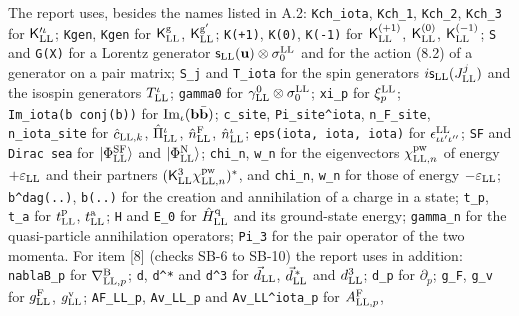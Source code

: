 \documentclass[
  10pt,
]{article}
\begin{document}
The report uses, besides the names listed in A.2:
\texttt{Kch\textquotesingle{}\_iota}, \texttt{Kch\textquotesingle{}\_1},
\texttt{Kch\textquotesingle{}\_2}, \texttt{Kch\textquotesingle{}\_3} for
\(\mathsf K'^\iota_{\rm LL}\); \texttt{Kgen},
\texttt{Kgen\textquotesingle{}} for \(\mathsf K^{\rm g}_{\rm LL}\),
\(\mathsf K^{\rm g'}_{\rm LL}\); \texttt{K(+1)}, \texttt{K(0)},
\texttt{K(-1)} for \(\mathsf K^{(+1)}_{\rm LL}\),
\(\mathsf K^{(0)}_{\rm LL}\), \(\mathsf K^{(-1)}_{\rm LL}\); \texttt{S}
and \texttt{G(X)} for a Lorentz generator
\(\mathsf s_{\rm LL}(\mathbf u)\otimes\sigma^{\rm LL}_0\) and for the
action (8.2) of a generator on a pair matrix; \texttt{S\_j} and
\texttt{T\_iota} for the spin generators
\(i\mathsf s_{\rm LL}(J^j_{\rm LL})\) and the isospin generators
\(T^\iota_{\rm LL}\); \texttt{gamma0} for
\(\gamma^0_{\rm LL}\otimes\sigma^{\rm LL}_0\); \texttt{xi\_p} for
\(\xi^{\rm LL}_p\); \texttt{Im\_iota(b\ conj(b))} for
\({\rm Im}_\iota(\mathbf b\bar{\mathbf b})\); \texttt{c\_site},
\texttt{Pi\_site\^{}iota}, \texttt{n\_F\_site}, \texttt{n\_iota\_site}
for \(\hat c_{{\rm LL},k}\), \(\hat\Pi^\iota_{\rm LL}\),
\(\hat n^{\rm F}_{\rm LL}\), \(\hat n^\iota_{\rm LL}\);
\texttt{eps(iota,\ iota\textquotesingle{},\ iota\textquotesingle{}\textquotesingle{})}
for \(\epsilon^{\rm LL}_{\iota\iota'\iota''}\); \texttt{SF} and
\texttt{Dirac\ sea} for \(\lvert\Phi^{\rm SF}_{\rm LL}\rangle\) and
\(\lvert\Phi^{\rm N}_{\rm LL}\rangle\); \texttt{chi\_n}, \texttt{w\_n}
for the eigenvectors \(\chi^{\rm pw}_{{\rm LL},n}\) of energy
\(+\varepsilon_{\rm LL}\) and their partners
\((\mathsf K^3_{\rm LL}\chi^{\rm pw}_{{\rm LL},n})^*\), and
\texttt{chi\textquotesingle{}\_n}, \texttt{w\textquotesingle{}\_n} for
those of energy \(-\varepsilon_{\rm LL}\); \texttt{b\^{}dag(..)},
\texttt{b(..)} for the creation and annihilation of a charge in a state;
\texttt{t\_p}, \texttt{t\_a} for \(t^{\rm p}_{\rm LL}\),
\(t^{\rm a}_{\rm LL}\); \texttt{H} and \texttt{E\_0} for
\(\hat H^{\rm q}_{\rm LL}\) and its ground-state energy;
\texttt{gamma\_n} for the quasi-particle annihilation operators;
\texttt{Pi\_3} for the pair operator of the two momenta. For item
{[}8{]} (checks SB-6 to SB-10) the report uses in addition:
\texttt{nablaB\_p} for \(\nabla^{\rm B}_{{\rm LL},p}\); \texttt{d},
\texttt{d\^{}*} and \texttt{d\^{}3} for \(\vec d_{\rm LL}\),
\(\vec d^{\,*}_{\rm LL}\) and \(d^3_{\rm LL}\); \texttt{d\_p} for
\(\partial_p\); \texttt{g\_F}, \texttt{g\_v} for \(g^{\rm F}_{\rm LL}\),
\(g^{\rm v}_{\rm LL}\); \texttt{AF\_LL\_p}, \texttt{Av\_LL\_p} and
\texttt{Av\_LL\^{}iota\_p} for \(A^{\rm F}_{{\rm LL},p}\),
\end{document}
